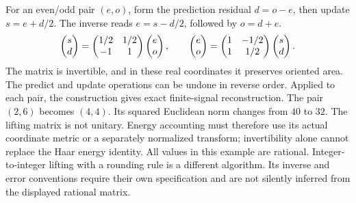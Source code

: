 For an even/odd pair $(e,o)$, form the prediction residual $d=o-e$, then update $s=e+d/2$. The inverse reads $e=s-d/2$, followed by $o=d+e$.
\[
\begin{pmatrix}s\\d\end{pmatrix}=\begin{pmatrix}1/2&1/2\\-1&1\end{pmatrix}\begin{pmatrix}e\\o\end{pmatrix},
\qquad
\begin{pmatrix}e\\o\end{pmatrix}=\begin{pmatrix}1&-1/2\\1&1/2\end{pmatrix}\begin{pmatrix}s\\d\end{pmatrix}.
\]
The matrix is invertible, and in these real coordinates it preserves oriented area. The predict and update operations can be undone in reverse order. Applied to each pair, the construction gives exact finite-signal reconstruction.
The pair $(2,6)$ becomes $(4,4)$. Its squared Euclidean norm changes from $40$ to $32$. The lifting matrix is not unitary. Energy accounting must therefore use its actual coordinate metric or a separately normalized transform; invertibility alone cannot replace the Haar energy identity.
All values in this example are rational. Integer-to-integer lifting with a rounding rule is a different algorithm. Its inverse and error conventions require their own specification and are not silently inferred from the displayed rational matrix.


